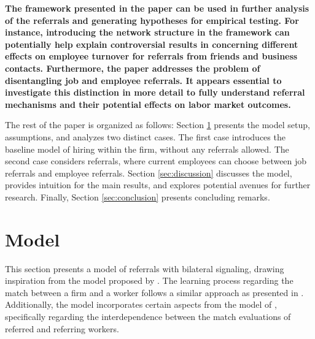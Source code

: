 \documentclass[12pt]{article}
\begin{document}
\textbf{The framework presented in the paper can be used in further analysis of the referrals and generating hypotheses for empirical testing. For instance, introducing the network structure in the framework can potentially help explain controversial results in \cite{lester2021heterogeneous} concerning different effects on employee turnover for referrals from friends and business contacts. Furthermore, the paper addresses the problem of disentangling job and employee referrals. It appears essential to investigate this distinction in more detail to fully understand referral mechanisms and their potential effects on labor market outcomes.}

The rest of the paper is organized as follows: Section \ref{sec:model} presents the model setup, assumptions, and analyzes two distinct cases. The first case introduces the baseline model of hiring within the firm, without any referrals allowed. The second case considers referrals, where current employees can choose between job referrals and employee referrals. Section \ref{sec:discussion} discusses the model, provides intuition for the main results, and explores potential avenues for further research. Finally, Section \ref{sec:conclusion} presents concluding remarks.


\section{Model} \label{sec:model}

This section presents a model of referrals with bilateral signaling, drawing inspiration from the model proposed by \cite{waldman1984job}. The learning process regarding the match between a firm and a worker follows a similar approach as presented in \cite{gibbons1999theory, gibbons2006enriching}. Additionally, the model incorporates certain aspects from the model of \cite{ekinci2016employee}, specifically regarding the interdependence between the match evaluations of referred and referring workers.
\end{document}
